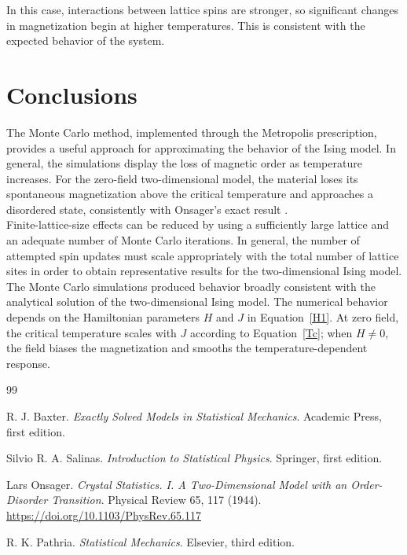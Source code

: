 \documentclass[a4paper]{article}
\begin{document}
In this case, interactions between lattice spins are stronger, so significant changes in magnetization begin at higher temperatures. This is consistent with the expected behavior of the system.

\section{Conclusions}
The Monte Carlo method, implemented through the Metropolis prescription, provides a useful approach for approximating the behavior of the Ising model. In general, the simulations display the loss of magnetic order as temperature increases. For the zero-field two-dimensional model, the material loses its spontaneous magnetization above the critical temperature and approaches a disordered state, consistently with Onsager's exact result \cite{Onsanger}.\\

Finite-lattice-size effects can be reduced by using a sufficiently large lattice and an adequate number of Monte Carlo iterations. In general, the number of attempted spin updates must scale appropriately with the total number of lattice sites in order to obtain representative results for the two-dimensional Ising model.\\

The Monte Carlo simulations produced behavior broadly consistent with the analytical solution of the two-dimensional Ising model. The numerical behavior depends on the Hamiltonian parameters $H$ and $J$ in Equation~\ref{H1}. At zero field, the critical temperature scales with $J$ according to Equation~\ref{Tc}; when $H\neq0$, the field biases the magnetization and smooths the temperature-dependent response.

\begin{thebibliography}{99}

 R. J. Baxter. \textit{Exactly Solved Models in Statistical Mechanics}. Academic Press, first edition.

 Silvio R. A. Salinas. \textit{Introduction to Statistical Physics}. Springer, first edition.

 Lars Onsager. \textit{Crystal Statistics. I. A Two-Dimensional Model with an Order-Disorder Transition}. Physical Review 65, 117 (1944). \url{https://doi.org/10.1103/PhysRev.65.117}

 R. K. Pathria. \textit{Statistical Mechanics}. Elsevier, third edition.

\end{thebibliography}
\end{document}
